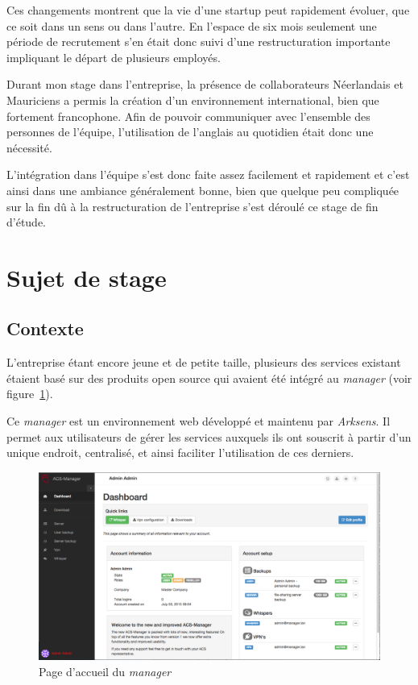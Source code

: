 \documentclass[a4paper,10pt, twoside]{report}
\begin{document}
\begin{spacing}{1.2}
Ces changements montrent que la vie d'une startup peut rapidement \'evoluer,
que ce soit dans un sens ou dans l'autre. En l'espace de six mois seulement
une p\'eriode de recrutement s'en \'etait donc suivi d'une restructuration
importante impliquant le d\'epart de plusieurs employ\'es.

Durant mon stage dans l'entreprise, la pr\'esence de collaborateurs
N\'eerlandais et Mauriciens a permis la cr\'eation d'un environnement
international, bien que fortement francophone. Afin de pouvoir communiquer avec
l'ensemble des personnes de l'\'equipe, l'utilisation de l'anglais au quotidien
\'etait donc une n\'ecessit\'e.

L'int\'egration dans l'\'equipe s'est donc faite assez facilement et rapidement
et c'est ainsi dans une ambiance g\'en\'eralement bonne, bien que quelque peu
compliqu\'ee sur la fin d\^u \`a la restructuration de l'entreprise s'est
d\'eroul\'e ce stage de fin d'\'etude.

\section{Sujet de stage}
\subsection{Contexte}
L'entreprise \'etant encore jeune et de petite taille, plusieurs des services
existant \'etaient bas\'e sur des produits open source qui avaient \'et\'e
int\'egr\'e au \textit{manager} (voir figure~\ref{managerFront}).

Ce \textit{manager} est un environnement web d\'evelopp\'e et maintenu par
\textit{Arksens}. Il permet aux utilisateurs de g\'erer les services auxquels
ils ont souscrit \`a partir d'un unique endroit, centralis\'e, et ainsi
faciliter l'utilisation de ces derniers.

\begin{figure}[h!]
  \centering
  \includegraphics[width=15cm]{produits/manager.png}
  \caption{\label{managerFront} Page d'accueil du \textit{manager}}
\end{figure}


\end{spacing}
\end{document}
